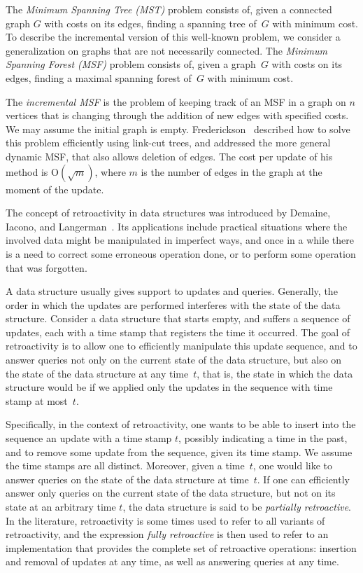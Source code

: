 \documentclass[reqno,11pt]{amsart}
\newcommand{\Oh}{\mathrm{O}}
\begin{document}
The \emph{Minimum Spanning Tree (MST)} problem consists of, given a connected 
graph $G$ with costs on its edges, finding a spanning tree of~$G$ with minimum cost. 
To describe the incremental version of this well-known problem, 
we consider a generalization on graphs that are not necessarily connected. 
The \emph{Minimum Spanning Forest (MSF)} problem consists of, given a graph~$G$ with 
costs on its edges, finding a maximal spanning forest of~$G$ with minimum cost. 

The \emph{incremental MSF} is the problem of keeping track of an MSF in a graph on 
$n$ vertices that is changing through the addition of new edges with specified costs.  
We may assume the initial graph is empty. 
Frederickson~\cite{Frederickson1983} described how to solve this problem efficiently 
using link-cut trees, and addressed the more general dynamic MSF,
that also allows deletion of edges.  The cost per update of his method is $\Oh(\sqrt{m})$, 
where $m$ is the number of edges in the graph at the moment of the update.

The concept of retroactivity in data structures was introduced by Demaine, Iacono, 
and Langerman~\cite{DemaineIL2007}.  Its applications include practical situations 
where the involved data might be manipulated in imperfect ways, and once in a while 
there is a need to correct some erroneous operation done, or to perform some operation 
that was forgotten.

A data structure usually gives support to updates and queries.  
Generally, the order in which the updates are performed interferes with the state 
of the data structure. 
Consider a data structure that starts empty, and suffers a sequence of updates, 
each with a time stamp that registers the time it occurred. 
The goal of retroactivity is to allow one to efficiently manipulate this update sequence, 
and to answer queries not only on the current state of the data structure, 
but also on the state of the data structure at any time~$t$, that is, 
the state in which the data structure would be if we applied only the updates 
in the sequence with time stamp at most~$t$.

Specifically, in the context of retroactivity, one wants to be able to insert into 
the sequence an update with a time stamp $t$, possibly indicating a time in the past, 
and to remove some update from the sequence, given its time stamp.
We assume the time stamps are all distinct.  Moreover, given a time~$t$, 
one would like to answer queries on the state of the data structure at time~$t$. 
If one can efficiently answer only queries on the current state of the data structure, 
but not on its state at an arbitrary time $t$, the data structure is said to be 
\emph{partially retroactive}.  In the literature, retroactivity is some times used 
to refer to all variants of retroactivity, and the expression \emph{fully retroactive}
is then used to refer to an implementation that provides the complete set of retroactive
operations: insertion and removal of updates at any time, as well as answering queries 
at any time. 
\end{document}
